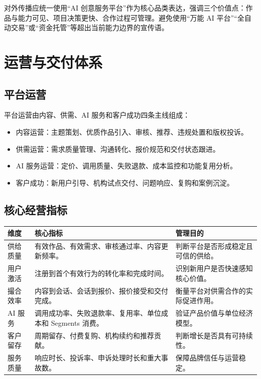 \documentclass[12pt,a4paper,openany,fontset=fandol]{ctexrep}
\begin{document}
对外传播应统一使用“AI 创意服务平台”作为核心品类表达，强调三个价值点：作品与能力可见、项目决策更快、合作过程可管理。避免使用“万能 AI 平台”“全自动交易”或“资金托管”等超出当前能力边界的宣传语。

\chapter{运营与交付体系}

\section{平台运营}

平台运营由内容、供需、AI 服务和客户成功四条主线组成：

\begin{itemize}
  \item 内容运营：主题策划、优质作品引入、审核、推荐、违规处置和版权投诉。
  \item 供需运营：需求质量管理、沟通转化、报价规范和交付状态跟进。
  \item AI 服务运营：定价、调用质量、失败退款、成本监控和功能复用分析。
  \item 客户成功：新用户引导、机构试点交付、问题响应、复购和案例沉淀。
\end{itemize}

\section{核心经营指标}

\begin{longtable}{p{3cm} p{5cm} p{5.8cm}}
\toprule
维度 & 核心指标 & 管理目的 \\
\midrule
供给质量 & 有效作品、有效需求、审核通过率、内容更新频率。 & 判断平台是否形成稳定且可信的供给。 \\
用户激活 & 注册到首个有效行为的转化率和完成时间。 & 识别新用户是否快速感知核心价值。 \\
撮合效率 & 内容到会话、会话到报价、报价接受和交付完成。 & 衡量平台对供需合作的实际促进作用。 \\
AI 服务 & 调用成功率、失败退款率、复用率、单位成本和 Segments 消费。 & 验证产品价值与单位经济模型。 \\
客户留存 & 周期留存、付费复购、机构续约和推荐贡献。 & 判断增长是否具有可持续性。 \\
服务质量 & 响应时长、投诉率、申诉处理时长和重大事故数。 & 保障品牌信任与运营稳定。 \\
\bottomrule
\end{longtable}
\end{document}
